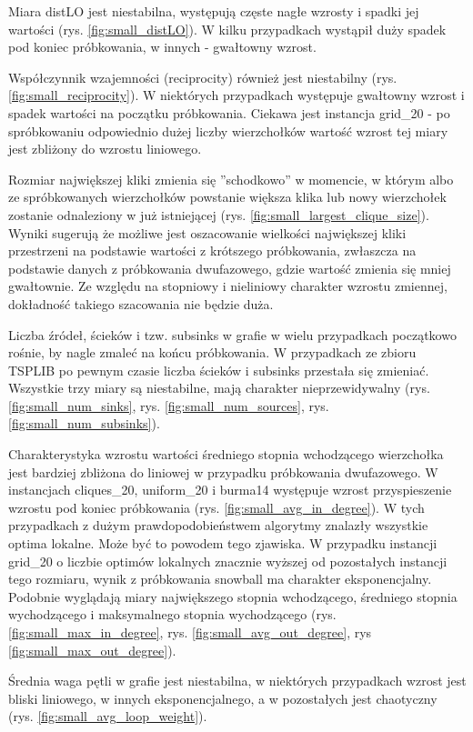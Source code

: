 Miara distLO jest niestabilna, występują częste nagłe wzrosty i spadki jej wartości (rys. \ref{fig:small_distLO}).
W kilku przypadkach wystąpił duży spadek pod koniec próbkowania, w innych - gwałtowny wzrost.

Współczynnik wzajemności (reciprocity) również jest niestabilny (rys. \ref{fig:small_reciprocity}).
W niektórych przypadkach występuje gwałtowny wzrost i spadek wartości na początku próbkowania.
Ciekawa jest instancja grid\_20 - po spróbkowaniu odpowiednio dużej liczby wierzchołków
wartość wzrost tej miary jest zbliżony do wzrostu liniowego.

Rozmiar największej kliki zmienia się ''schodkowo'' w momencie, w którym albo ze spróbkowanych wierzchołków
powstanie większa klika lub nowy wierzchołek zostanie odnaleziony w już istniejącej (rys. \ref{fig:small_largest_clique_size}).
Wyniki sugerują że możliwe jest oszacowanie wielkości największej kliki przestrzeni na podstawie wartości
z krótszego próbkowania, zwłaszcza na podstawie danych z próbkowania dwufazowego, gdzie
wartość zmienia się mniej gwałtownie. Ze względu na stopniowy i nieliniowy charakter wzrostu zmiennej,
dokładność takiego szacowania nie będzie duża.

Liczba źródeł, ścieków i tzw. subsinks w grafie w wielu przypadkach początkowo rośnie, by nagle zmaleć na końcu próbkowania.
W przypadkach ze zbioru TSPLIB po pewnym czasie liczba ścieków i subsinks przestała się zmieniać.
Wszystkie trzy miary są niestabilne, mają charakter nieprzewidywalny (rys. \ref{fig:small_num_sinks}, rys. \ref{fig:small_num_sources}, rys. \ref{fig:small_num_subsinks}).

Charakterystyka wzrostu wartości średniego stopnia wchodzącego wierzchołka jest bardziej zbliżona do liniowej
w przypadku próbkowania dwufazowego. W instancjach cliques\_20, uniform\_20 i burma14 występuje
wzrost przyspieszenie wzrostu pod koniec próbkowania (rys. \ref{fig:small_avg_in_degree}).
W tych przypadkach z dużym prawdopodobieństwem algorytmy znalazły wszystkie optima lokalne.
Może być to powodem tego zjawiska.
W przypadku instancji grid\_20 o liczbie optimów lokalnych znacznie wyższej od pozostałych instancji tego rozmiaru,
wynik z próbkowania snowball ma charakter eksponencjalny.
Podobnie wyglądają miary największego stopnia wchodzącego, średniego stopnia wychodzącego i maksymalnego stopnia wychodzącego
(rys. \ref{fig:small_max_in_degree}, rys. \ref{fig:small_avg_out_degree}, rys \ref{fig:small_max_out_degree}).

Średnia waga pętli w grafie jest niestabilna, w niektórych przypadkach wzrost jest bliski liniowego, w innych
eksponencjalnego, a w pozostałych jest chaotyczny (rys. \ref{fig:small_avg_loop_weight}).

